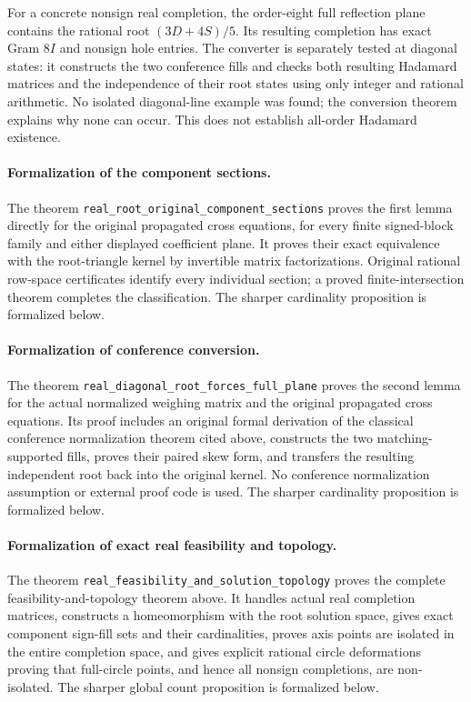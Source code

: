For a concrete nonsign real completion, the order-eight full
reflection plane contains the rational root $(3D+4S)/5$.
Its resulting completion has exact Gram $8I$ and nonsign hole
entries. The converter is separately tested at diagonal states:
it constructs the two conference fills and checks both resulting
Hadamard matrices and the independence of their root states using
only integer and rational arithmetic. No isolated diagonal-line
example was found; the conversion theorem explains why none can
occur. This does not establish all-order Hadamard existence.

\paragraph{Formalization of the component sections.} The theorem \texttt{real\_\allowbreak root\_\allowbreak original\_\allowbreak component\_\allowbreak sections} proves the first lemma directly for the original propagated cross equations, for every finite signed-block family and either displayed coefficient plane. It proves their exact equivalence with the root-triangle kernel by invertible matrix factorizations. Original rational row-space certificates identify every individual section; a proved finite-intersection theorem completes the classification. The sharper cardinality proposition is formalized below.

\paragraph{Formalization of conference conversion.} The theorem \texttt{real\_\allowbreak diagonal\_\allowbreak root\_\allowbreak forces\_\allowbreak full\_\allowbreak plane} proves the second lemma for the actual normalized weighing matrix and the original propagated cross equations. Its proof includes an original formal derivation of the classical conference normalization theorem cited above, constructs the two matching-supported fills, proves their paired skew form, and transfers the resulting independent root back into the original kernel. No conference normalization assumption or external proof code is used. The sharper cardinality proposition is formalized below.

\paragraph{Formalization of exact real feasibility and topology.} The theorem \texttt{real\_\allowbreak feasibility\_\allowbreak and\_\allowbreak solution\_\allowbreak topology} proves the complete feasibility-and-topology theorem above. It handles actual real completion matrices, constructs a homeomorphism with the root solution space, gives exact component sign-fill sets and their cardinalities, proves axis points are isolated in the entire completion space, and gives explicit rational circle deformations proving that full-circle points, and hence all nonsign completions, are non-isolated. The sharper global count proposition is formalized below.


